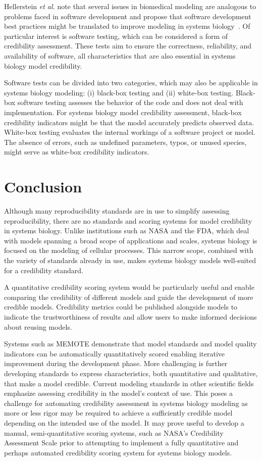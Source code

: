 \documentclass[12pt]{report}
\begin{document}
Hellerstein \textit{et al.} note that several issues in biomedical modeling are analogous to problems faced in software development and propose that software development best practices might be translated to improve modeling in systems biology~\cite{Hellerstein2019}. Of particular interest is software testing, which can be considered a form of credibility assessment. These tests aim to ensure the correctness, reliability, and availability of software, all characteristics that are also essential in systems biology model credibility. 


Software tests can be divided into two categories, which may also be applicable in systems biology modeling: (i) black-box testing and (ii) white-box testing. Black-box software testing assesses the behavior of the code and does not deal with implementation. For systems biology model credibility assessment, black-box credibility indicators might be that the model accurately predicts observed data. White-box testing evaluates the internal workings of a software project or model. The absence of errors, such as undefined parameters, typos, or unused species, might serve as white-box credibility indicators.  



\section{Conclusion}

Although many reproducibility standards are in use to simplify assessing reproducibility, there are no standards and scoring systems for model credibility in systems biology. Unlike institutions such as NASA and the FDA, which deal with models spanning a broad scope of applications and scales, systems biology is focused on the modeling of cellular processes. This narrow scope, combined with the variety of standards already in use, makes systems biology models well-suited for a credibility standard.

A quantitative credibility scoring system would be particularly useful and enable comparing the credibility of different models and guide the development of more credible models. Credibility metrics could be published alongside models to indicate the trustworthiness of results and allow users to make informed decisions about reusing models.


Systems such as MEMOTE demonstrate that model standards and model quality indicators can be automatically quantitatively scored enabling iterative improvement during the development phase. More challenging is further developing standards to express characteristics, both quantitative and qualitative, that make a model credible. Current modeling standards in other scientific fields emphasize assessing credibility in the model's context of use. This poses a challenge for automating credibility assessment in systems biology modeling as more or less rigor may be required to achieve a sufficiently credible model depending on the intended use of the model. It may prove useful to develop a manual, semi-quantitative scoring systems, such as NASA's Credibility Assessment Scale prior to attempting to implement a fully quantitative and perhaps automated credibility scoring system for systems biology models.
\end{document}
